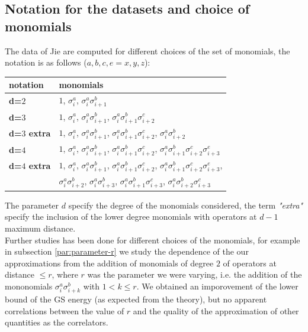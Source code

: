 \documentclass[10pt,a4paper,twoside,twocolumn]{revtex4-1}
\begin{document}
\subsection{Notation for the datasets and choice of monomials} 
The data of Jie are computed for different choices of the set of monomials, the notation is as follows ($a,b,c,e=x,y,z$):
\begin{table}[H]
\label{tab:notation-B1}
\begin{tabular}{ |l|l| }
\hline
\textbf{notation} & \textbf{monomials}\\
\hline
\textbf{d=$2$} & $1$, $\sigma^{a}_i$, $\sigma^{a}_i\sigma^{b}_{i+1}$\\
\hline
\textbf{d=$3$} & $1$, $\sigma^{a}_i$, $\sigma^{a}_i \sigma^{b}_{i+1}$, $\sigma^{a}_i \sigma^{b}_{i+1} \sigma^{c}_{i+2}$ \\
\hline
\textbf{d=$3$ extra} & $1$, $\sigma^{a}_i$, $\sigma^{a}_i \sigma^{b}_{i+1}$, $\sigma^{a}_i \sigma^{b}_{i+1} \sigma^{c}_{i+2}$, $\sigma^{a}_i \sigma^{b}_{i+2}$ \\
\hline
\textbf{d=$4$} & $1$, $\sigma^{a}_i$, $\sigma^{a}_i \sigma^{b}_{i+1}$, $\sigma^{a}_i \sigma^{b}_{i+1} \sigma^{c}_{i+2}$, $\sigma^{a}_i \sigma^{b}_{i+1} \sigma^{c}_{i+2} \sigma^{e}_{i+3}$\\
\hline
 \textbf{d=$4$ extra} & $1$, $\sigma^{a}_i$, $\sigma^{a}_i \sigma^{b}_{i+1}$, $\sigma^{a}_i \sigma^{b}_{i+1} \sigma^{c}_{i+2}$, $\sigma^{a}_i \sigma^{b}_{i+1} \sigma^{c}_{i+2} \sigma^{e}_{i+3}$, \\
 &  $\sigma^{a}_i \sigma^{b}_{i+2}$, $\sigma^{a}_i \sigma^{b}_{i+3}$, $\sigma^{a}_i \sigma^{b}_{i+1} \sigma^{c}_{i+3}$, $\sigma^{a}_i \sigma^{b}_{i+2} \sigma^{c}_{i+3}$\\
\hline
\end{tabular}
\end{table}
The parameter $d$ specify the degree of the monomials considered, the term \textit{"extra"} specify the inclusion of the lower degree monomials with operators at $d-1$ maximum distance.\\
Further studies has been done for different choices of the monomials, for example in subsection \ref{par:parameter-r} we study the dependence of the our approximations from the addition of monomials of degree $2$ of operators at distance $\leq r$, where $r$ was the parameter we were varying, i.e. the addition of the mononomials $\sigma^{a}_{i}\sigma^{b}_{i+k}$ with $1<k\leq r$. We obtained an imporovement of the lower bound of the GS energy (as expected from the theory), but no apparent correlations between the value of $r$ and the quality of the approximation of other quantities as the correlators.
 
\end{document}
